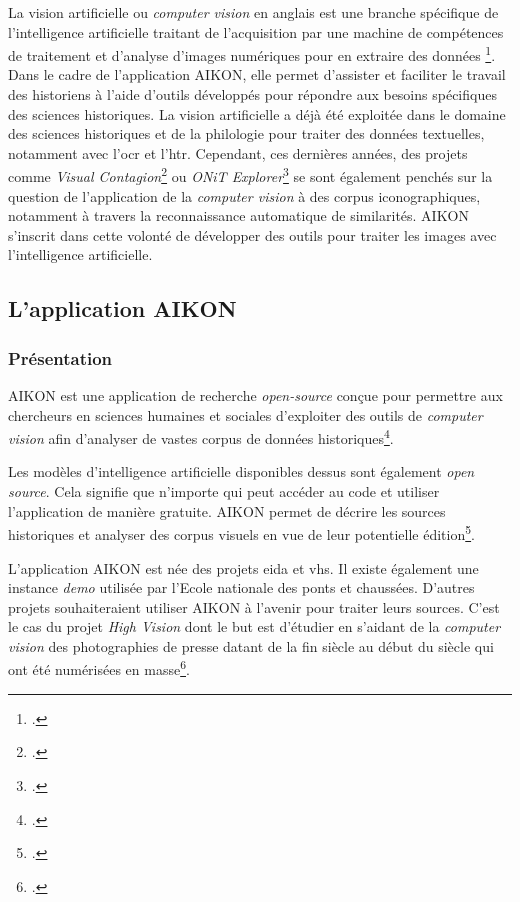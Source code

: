 La vision artificielle ou \textit{computer vision} en anglais est \og une branche spécifique de l'intelligence artificielle traitant de l'acquisition par une machine de compétences de traitement et d'analyse d'images numériques pour en extraire des données \fg \footcite{norindrTraitementSourcesHistoriques2023}.
Dans le cadre de l'application AIKON, elle permet d'assister et faciliter le travail des historiens à l'aide d'outils développés pour répondre aux besoins spécifiques des sciences historiques.
La vision artificielle a déjà été exploitée dans le domaine des sciences historiques et de la philologie pour traiter des données textuelles, notamment avec l'\gls{ocr} et l'\gls{htr}. Cependant, ces dernières années, des projets comme \textit{Visual Contagion}\footcite{HomeVisualContagions} ou \textit{ONiT Explorer}\footcite{ONiTExplorer} se sont également penchés sur la question de l'application de la \textit{computer vision} à des corpus iconographiques, notamment à travers la reconnaissance automatique de similarités. AIKON s'inscrit dans cette volonté de développer des outils pour traiter les images avec l'intelligence artificielle. 

\subsection{L'application AIKON}

\subsubsection{Présentation}
AIKON est une application de recherche \textit{open-source} conçue pour permettre aux chercheurs en sciences humaines et sociales d'exploiter des outils de \textit{computer vision} afin d'analyser de vastes corpus de données historiques\footcite{Aikon2024}.

Les modèles d'intelligence artificielle disponibles dessus sont également \textit{open source}. Cela signifie que n'importe qui peut accéder au code et utiliser l'application de manière gratuite. 
AIKON permet de décrire les sources historiques et analyser des corpus visuels en vue de leur potentielle édition\footcite{albouyAIKONComputerVision}.

L'application AIKON est née des projets \gls{eida} et \gls{vhs}. Il existe également une instance \textit{demo} utilisée par l'Ecole nationale des ponts et chaussées.
D'autres projets souhaiteraient utiliser AIKON à l'avenir pour traiter leurs sources. C'est le cas du projet \textit{High Vision} dont le but est d'étudier en s'aidant de la \textit{computer vision} des photographies de presse datant de la fin \XIX siècle au début du \XX siècle qui ont été numérisées en masse\footcite{HIGHVISIONProjet2025}.

